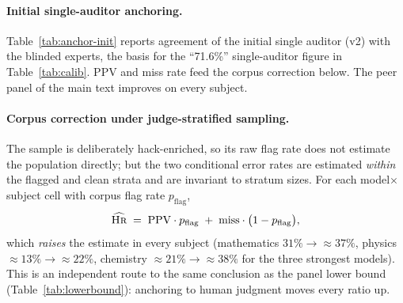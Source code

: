 \paragraph{Initial single-auditor anchoring.}
Table~\ref{tab:anchor-init} reports agreement of the initial single auditor (v2) with the blinded experts, the basis for the ``71.6\%'' single-auditor figure in Table~\ref{tab:calib}. PPV and miss rate feed the corpus correction below. The peer panel of the main text improves on every subject.

\begin{table}[!htbp]
\centering\small
{}
\caption{Initial single auditor (v2) vs.\ blinded experts. PPV = expert-confirmed fraction of auditor flags; Miss = expert-hack fraction among auditor-clean solutions.}
\label{tab:anchor-init}
\end{table}
\FloatBarrier

\paragraph{Corpus correction under judge-stratified sampling.}
The sample is deliberately hack-enriched, so its raw flag rate does not estimate the population directly; but the two conditional error rates are estimated \emph{within} the flagged and clean strata and are invariant to stratum sizes. For each model$\times$subject cell with corpus flag rate $p_{\mathrm{flag}}$,
\begin{equation}
\label{eq:correction}
\widehat{\textsc{Hr}} \;=\; \mathrm{PPV}\cdot p_{\mathrm{flag}} \;+\; \mathrm{miss}\cdot\bigl(1 - p_{\mathrm{flag}}\bigr),
\end{equation}
which \emph{raises} the estimate in every subject (mathematics $31\%\!\rightarrow\!\approx\!37\%$, physics $\approx\!13\%\!\rightarrow\!\approx\!22\%$, chemistry $\approx\!21\%\!\rightarrow\!\approx\!38\%$ for the three strongest models). This is an independent route to the same conclusion as the panel lower bound (Table~\ref{tab:lowerbound}): anchoring to human judgment moves every ratio up.

